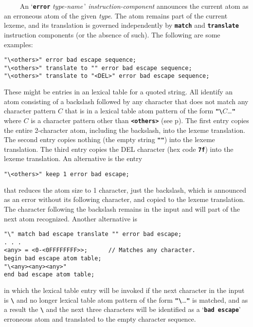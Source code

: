\documentclass[12pt]{article}
\makeatletter
\newcommand{\TT}[1]{{\tt \bfseries #1}}
\newcommand{\ttmkey}[2]{\TT{#1}\index{#1@{\tt #1}!#2}}
\newcommand{\pagref}[1]{p\pageref{#1}}
\newenvironment{indpar}[1][0.3in]%
	{\begin{list}{}%
		     {\setlength{\itemsep}{0in}%
		      \setlength{\topsep}{0in}%
		      \setlength{\parsep}{1ex}%
		      \setlength{\labelwidth}{#1}%
		      \setlength{\leftmargin}{#1}%
		      \addtolength{\leftmargin}{\labelsep}}%
	 \item}%
	{\end{list}}
\makeatother
\begin{document}
~~~~ An `\ttmkey{error}{in lexical program} {\em type-name}\,'
{\em instruction-component}
an\-noun\-ces the current atom as an erroneous atom of the given {\em type}.
The atom remains part of the current lexeme,
and its translation is governed
independently by \TT{match} and \TT{translate} instruction components
(or the absence of such).
The following are some examples:
\begin{indpar}\begin{verbatim}
"\<others>" error bad escape sequence;
"\<others>" translate to "" error bad escape sequence;
"\<others>" translate to "<DEL>" error bad escape sequence;
\end{verbatim}\end{indpar}
These might be entries in an lexical table for a quoted string.
All identify an atom consisting of a backslash followed by any
character that does not match any character pattern $C$ that is in
a lexical table
atom pattern of the form \TT{"\textbackslash}$C$\ldots\TT{"} where $C$ is a character
pattern other than \TT{<others>} (see \pagref{<OTHERS>}).
The first entry copies the entire 2-character atom, including the
backslash, into the lexeme translation.  The second entry copies
nothing (the empty string \TT{""}) into the lexeme translation.
The third entry copies the DEL character (hex code \TT{7f})
into the lexeme translation.  An alternative is the entry
\begin{indpar}\begin{verbatim}
"\<others>" keep 1 error bad escape;
\end{verbatim}\end{indpar}
that reduces the atom size to 1 character, just the backslash,
which is announced as an error without its following character,
and copied to the lexeme translation.  The character following
the backslash remains in the input and will part of the next
atom recognized.
Another alternative is
\begin{indpar}\begin{verbatim}
"\" match bad escape translate "" error bad escape;
. . .
<any> = <0-<0FFFFFFFF>>;      // Matches any character.
begin bad escape atom table;
"\<any><any><any>"
end bad escape atom table;
\end{verbatim}\end{indpar}
in which the lexical table entry will be invoked if the next character
in the input is \TT{\textbackslash} and no longer
lexical table atom pattern of the form \TT{"\textbackslash}\ldots\TT{"} is matched, 
and as a result the \TT{\textbackslash} and the next three characters will be identified
as a `\TT{bad escape}'
erroneous atom and translated to the empty character sequence.
\end{document}
